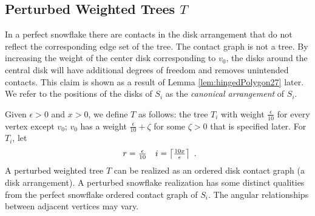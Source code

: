 \subsection{Perturbed Weighted Trees $T$}
In a perfect snowflake there are contacts in the disk arrangement that do not reflect the corresponding edge set of the tree.  
The contact graph is not a tree.
By increasing the weight of the center disk corresponding to $v_0$, the disks around the central disk will have additional degrees of freedom and removes unintended contacts.    
This claim is shown as a result of Lemma \ref{lem:hingedPolygon27} later.
We refer to the positions of the disks of $S_i$ as the \textit{canonical arrangement} of $S_i$.

Given $\epsilon > 0$ and $x >0$, we define $T$ as follows: the tree $T_i$ with weight $\frac{\epsilon}{10}$ for every vertex except $v_0$; $v_0$ has a weight $\frac{\epsilon}{10} + \zeta$ for some $\zeta>0$ that is specified later.  For $T_i$, let 
$$\begin{array}{cc}
r = \frac{\epsilon}{10}&i = \left\lceil \frac{10x}{\epsilon} \right\rceil
\end{array} .$$ 
A perturbed weighted tree $T$ can be realized as an ordered disk contact graph (a disk arrangement).  
A perturbed snowflake realization has some distinct qualities from the perfect snowflake ordered contact graph of $S_i$.    
The angular relationships between adjacent vertices may vary.
